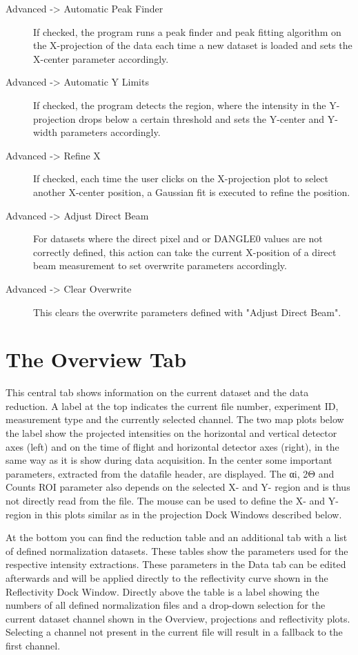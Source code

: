 \begin{description}
   \item[{ Advanced -> Automatic Peak Finder}] If checked, the program runs a peak finder and peak fitting algorithm on the X-projection of the data each time a new dataset is loaded and sets the X-center parameter accordingly.
   \item[{ Advanced -> Automatic Y Limits}] If checked, the program detects the region, where the intensity in the Y-projection drops below a certain threshold and sets the Y-center and Y-width parameters accordingly.
   \item[{ Advanced -> Refine X}] If checked, each time the user clicks on the X-projection plot to select another X-center position, a Gaussian fit is executed to refine the position.
   \item[{ Advanced -> Adjust Direct Beam}] For datasets where the direct pixel and or DANGLE0 values are not correctly defined, this action can take the current X-position of a direct beam measurement to set overwrite parameters accordingly.
   \item[{ Advanced -> Clear Overwrite}] This clears the overwrite parameters defined with "Adjust Direct Beam".
  \end{description}

\section{The Overview Tab}
  This central tab shows information on the current dataset and the data reduction. A label at the top indicates the current file number, experiment ID, measurement type and the currently selected channel.
  The two map plots below the label show the projected intensities on the horizontal and vertical detector axes (left) and on the time of flight and horizontal detector axes (right), in the same way as it is show during data acquisition.
  In the center some important parameters, extracted from the datafile header, are displayed. The αi, 2Θ and Counts ROI parameter also depends on the selected X- and Y- region and is thus not directly read from the file.
  The mouse can be used to define the X- and Y-region in this plots similar as in the projection Dock Windows described below.
  
  At the bottom you can find the reduction table and an additional tab with a list of defined normalization datasets.
  These tables show the parameters used for the respective intensity extractions.
  These parameters in the Data tab can be edited afterwards and will be applied directly to the reflectivity curve shown in the Reflectivity Dock Window.
  Directly above the table is a label showing the numbers of all defined normalization files and a drop-down selection for the current dataset channel shown in the Overview, projections and reflectivity plots.
  Selecting a channel not present in the current file will result in a fallback to the first channel.
  
